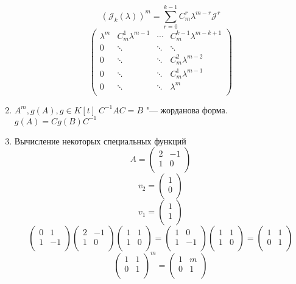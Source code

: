 \begin{enumerate}
$$(\mathcal{J}_k(\lambda))^m = \sum_{r = 0}^{k - 1}C_m^r \lambda^{m - r}\mathcal{J}^r$$
$$
\begin{pmatrix}
\lambda^m& C_m^1 \lambda^{m - 1} &\cdots& C_m^{k - 1}\lambda^{m - k + 1}\\
0&\ddots&\ddots&\ddots\\
0&\ddots&\ddots&C_m^2\lambda^{m - 2}\\
0&\ddots&\ddots&C_m^1\lambda^{m - 1}\\
0&\ddots&\ddots&\lambda^{m}\\
\end{pmatrix}
$$
\item $A^m, g(A), g \in K[t]$
$C^{-1}AC = B$ "--- жорданова форма.
$g(A) = Cg(B)C^{-1}$
\item Вычисление некоторых специальных функций
$$
A = \begin{pmatrix}
2&-1\\
1&0\\
\end{pmatrix}
$$
$$
v_2 = \begin{pmatrix}
1\\
0\\
\end{pmatrix}   
$$
$$
v_1 = \begin{pmatrix}
1\\
1\\
\end{pmatrix} 
$$
$$\begin{pmatrix}
0&1\\
1&-1\\
\end{pmatrix} 
\begin{pmatrix}
2&-1\\
1&0\\
\end{pmatrix} 
\begin{pmatrix}
1&1\\
1&0\\
\end{pmatrix} = 
\begin{pmatrix}
1&0\\
1&-1\\
\end{pmatrix} \begin{pmatrix}
1&1\\
1&0\\
\end{pmatrix} =
\begin{pmatrix}
1&1\\
0&1\\
\end{pmatrix}
$$
$$
\begin{pmatrix}
1&1\\
0&1\\
\end{pmatrix}^m =
\begin{pmatrix}
1&m\\
0&1\\
\end{pmatrix} 
$$


\end{enumerate}
